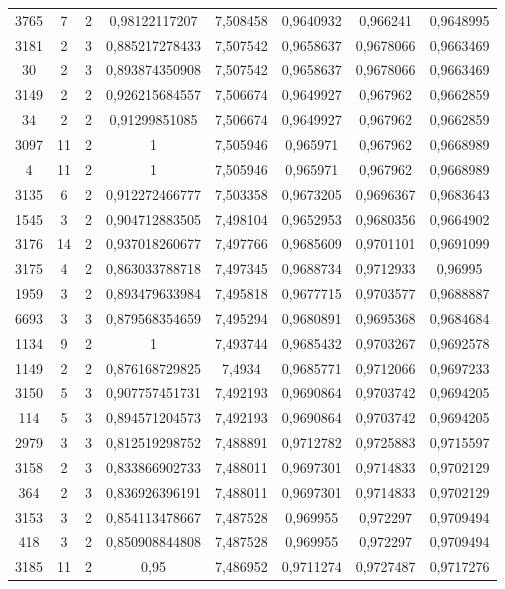 \begin{longtable}{|c|c|c|c|c|c|c|c|}
3765 & 7 & 2 & 0,98122117207 & 7,508458 & 0,9640932 & 0,966241 & 0,9648995 \\
3181 & 2 & 3 & 0,885217278433 & 7,507542 & 0,9658637 & 0,9678066 & 0,9663469 \\
30 & 2 & 3 & 0,893874350908 & 7,507542 & 0,9658637 & 0,9678066 & 0,9663469 \\
3149 & 2 & 2 & 0,926215684557 & 7,506674 & 0,9649927 & 0,967962 & 0,9662859 \\
34 & 2 & 2 & 0,91299851085 & 7,506674 & 0,9649927 & 0,967962 & 0,9662859 \\
3097 & 11 & 2 & 1 & 7,505946 & 0,965971 & 0,967962 & 0,9668989 \\
4 & 11 & 2 & 1 & 7,505946 & 0,965971 & 0,967962 & 0,9668989 \\
3135 & 6 & 2 & 0,912272466777 & 7,503358 & 0,9673205 & 0,9696367 & 0,9683643 \\
1545 & 3 & 2 & 0,904712883505 & 7,498104 & 0,9652953 & 0,9680356 & 0,9664902 \\
3176 & 14 & 2 & 0,937018260677 & 7,497766 & 0,9685609 & 0,9701101 & 0,9691099 \\
3175 & 4 & 2 & 0,863033788718 & 7,497345 & 0,9688734 & 0,9712933 & 0,96995 \\
1959 & 3 & 2 & 0,893479633984 & 7,495818 & 0,9677715 & 0,9703577 & 0,9688887 \\
6693 & 3 & 3 & 0,879568354659 & 7,495294 & 0,9680891 & 0,9695368 & 0,9684684 \\
1134 & 9 & 2 & 1 & 7,493744 & 0,9685432 & 0,9703267 & 0,9692578 \\
1149 & 2 & 2 & 0,876168729825 & 7,4934 & 0,9685771 & 0,9712066 & 0,9697233 \\
3150 & 5 & 3 & 0,907757451731 & 7,492193 & 0,9690864 & 0,9703742 & 0,9694205 \\
114 & 5 & 3 & 0,894571204573 & 7,492193 & 0,9690864 & 0,9703742 & 0,9694205 \\
2979 & 3 & 3 & 0,812519298752 & 7,488891 & 0,9712782 & 0,9725883 & 0,9715597 \\
3158 & 2 & 3 & 0,833866902733 & 7,488011 & 0,9697301 & 0,9714833 & 0,9702129 \\
364 & 2 & 3 & 0,836926396191 & 7,488011 & 0,9697301 & 0,9714833 & 0,9702129 \\
3153 & 3 & 2 & 0,854113478667 & 7,487528 & 0,969955 & 0,972297 & 0,9709494 \\
418 & 3 & 2 & 0,850908844808 & 7,487528 & 0,969955 & 0,972297 & 0,9709494 \\
3185 & 11 & 2 & 0,95 & 7,486952 & 0,9711274 & 0,9727487 & 0,9717276 \\

\end{longtable}
